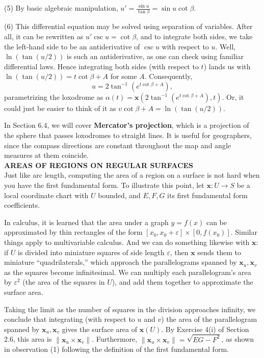 \documentclass[leqno]{book}
\begin{document}
(5) By basic algebraic manipulation, $u'=\frac{\sin u}{\tan\beta}=\sin u\cot\beta$.

(6) This differential equation may be solved using separation of variables.  After all, it can be rewritten as $u'\csc u=\cot\beta$, and to integrate both sides, we take the left-hand side to be an antiderivative of $\csc u$ with respect to $u$.  Well, $\ln(\tan(u/2))$ is such an antiderivative, as one can check using familiar differential laws.  Hence integrating both sides (with respect to $t$) lands us with $\ln(\tan(u/2))=t\cot\beta+A$ for some $A$.  Consequently,
$$u=2\tan^{-1}(e^{t\cot\beta+A}),$$
parametrizing the loxodrome as $\alpha(t)=\mathbf x(2\tan^{-1}(e^{t\cot\beta+A}),t)$.  Or, it could just be easier to think of it as $v\cot\beta+A=\ln(\tan(u/2))$.

In Section 6.4, we will cover \textbf{Mercator's projection}, which is a projection of the sphere that passes loxodromes to straight lines.  It is useful for geographers, since the compass directions are constant throughout the map and angle measures at them coincide.\\

\noindent\textbf{AREAS OF REGIONS ON REGULAR SURFACES}\\

\noindent Just like arc length, computing the area of a region on a surface is not hard when you have the first fundamental form.  To illustrate this point, let $\mathbf x:U\to S$ be a local coordinate chart with $U$ bounded, and $E,F,G$ its first fundamental form coefficients.

In calculus, it is learned that the area under a graph $y=f(x)$ can be approximated by thin rectangles of the form $[x_0,x_0+\varepsilon]\times[0,f(x_0)]$.  Similar things apply to multivariable calculus.  And we can do something likewise with $\mathbf x$: if $U$ is divided into miniature squares of side length $\varepsilon$, then $\mathbf x$ sends them to miniature ``quadrilaterals,'' which approach the parallelograms spanned by $\mathbf x_u,\mathbf x_v$ as the squares become infinitesimal.  We can multiply each parallelogram's area by $\varepsilon^2$ (the area of the squares in $U$), and add them together to approximate the surface area.

Taking the limit as the number of squares in the division approaches infinity, we conclude that integrating (with respect to $u$ and $v$) the area of the parallelogram spanned by $\mathbf x_u,\mathbf x_v$ gives the surface area of $\mathbf x(U)$.  By Exercise 4(i) of Section 2.6, this area is $\|\mathbf x_u\times\mathbf x_v\|$.  Furthermore, $\|\mathbf x_u\times\mathbf x_v\|=\sqrt{EG-F^2}$, as shown in observation (1) following the definition of the first fundamental form.
\end{document}
